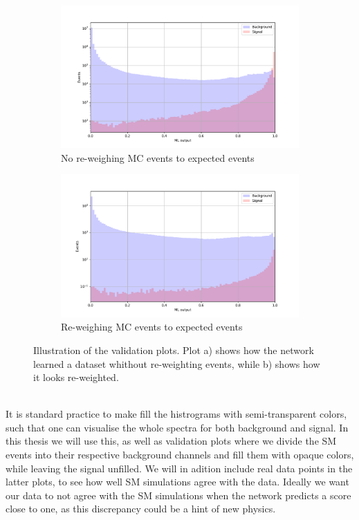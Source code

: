 \documentclass[12pt, a4paper]{book}
\begin{document}
\begin{figure}[!ht]
	\centering
    \begin{subfigure}[b]{0.7\textwidth}
        \centering
        \includegraphics[width=\textwidth]{VAL_unscaled.pdf}
        \caption{No re-weighing MC events to expected events}
    \end{subfigure}
    \hfill
    \begin{subfigure}[b]{0.7\textwidth}
        \centering
        \includegraphics[width=\textwidth]{VAL.pdf}
        \caption{Re-weighing MC events to expected events}
    \end{subfigure}
    \caption[Validation plots illustration]{Illustration of the validation plots. Plot a) shows how the network learned a dataset whithout re-weighting events, while b) shows how it looks re-weighted.}\label{fig:VAL}
\end{figure}
\\It is standard practice to make fill the histrograms with semi-transparent colors, such that one can visualise the whole spectra for both background and signal. In this thesis we will use this, as well as validation plots where we divide the SM events into their respective background channels and fill them with opaque 
colors, while leaving the signal unfilled. We will in adition include real data points in the latter plots, to see how well SM simulations agree with the data. Ideally we want our data to not agree with the SM simulations when the network 
predicts a score close to one, as this discrepancy could be a hint of new physics.
\end{document}
